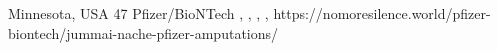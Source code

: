           {Minnesota, USA}
          {47}
          {Pfizer/BioNTech}
          {, }
          {
            ,
            ,
            ,
          }
          {https://nomoresilence.world/pfizer-biontech/jummai-nache-pfizer-amputations/}

